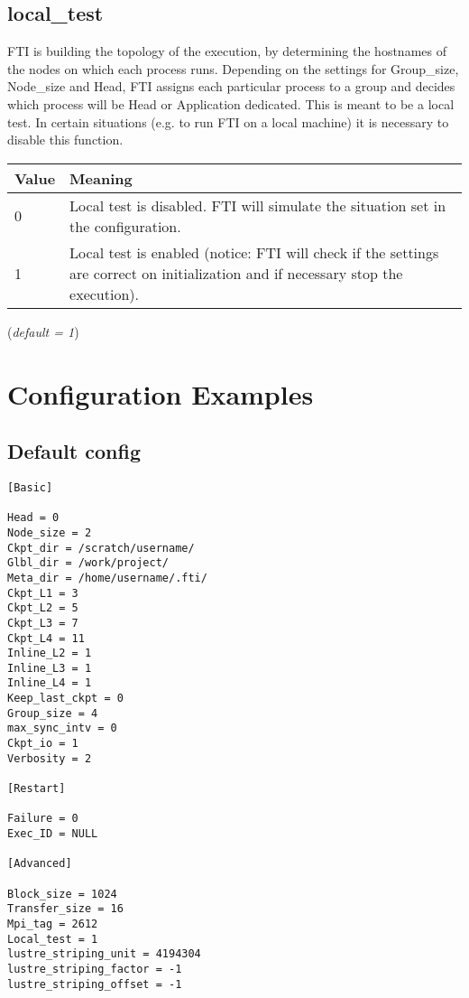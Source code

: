 \documentclass{refrep}
\begin{document}
\subsection{local\_test}\label{subsec:localtest}
FTI is building the topology of the execution, by determining the hostnames of the nodes on which each process runs. Depending on the settings for Group\_size, Node\_size and Head, FTI assigns each particular process to a group and decides which process will be Head or Application dedicated. This is meant to be a local test. In certain situations (e.g. to run FTI on a local machine) it is necessary to disable this function.
\begin{center}
\begin{tabular}[h!]{|p{}|p{}|}
\hline
\textbf{Value} & \textbf{Meaning} \\ \hline
0 & Local test is disabled. FTI will simulate the situation set in the configuration. \\ \hline
1 & Local test is enabled (notice: FTI will check if the settings are correct on initialization and if necessary stop the execution). \\ \hline
\end{tabular}
\end{center}
(\textit{default = 1})
\newpage
\section{Configuration Examples}\label{sec:configurationexamples}
\subsection{Default config}\label{subsec:configdefault}
\begin{center}
\begin{lstlisting}[frame=single]
[Basic]

Head = 0
Node_size = 2
Ckpt_dir = /scratch/username/
Glbl_dir = /work/project/
Meta_dir = /home/username/.fti/
Ckpt_L1 = 3
Ckpt_L2 = 5
Ckpt_L3 = 7
Ckpt_L4 = 11
Inline_L2 = 1
Inline_L3 = 1
Inline_L4 = 1
Keep_last_ckpt = 0
Group_size = 4
max_sync_intv = 0
Ckpt_io = 1
Verbosity = 2

[Restart]

Failure = 0
Exec_ID = NULL

[Advanced]

Block_size = 1024
Transfer_size = 16
Mpi_tag = 2612
Local_test = 1
lustre_striping_unit = 4194304 
lustre_striping_factor = -1 
lustre_striping_offset = -1 

\end{lstlisting}
\end{center}
\end{document}
